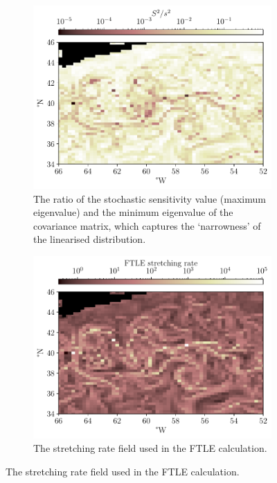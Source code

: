 \begin{figure}
\begin{center}
		\begin{subfigure}[t]{0.49\textwidth}
			\includegraphics[width=\textwidth]{chp06_applications/figures/gulf_stream/ratio_field_grid}
			\caption{The ratio of the stochastic sensitivity value (maximum eigenvalue) and the minimum eigenvalue of the covariance matrix, which captures the `narrowness' of the linearised distribution.}
		\end{subfigure}
		\begin{subfigure}[t]{0.49\textwidth}
			\includegraphics[width=\textwidth]{chp06_applications/figures/gulf_stream/ftle_field_grid}
			\caption{The stretching rate field used in the FTLE calculation.}
		\end{subfigure}

\end{center}
\end{figure}
